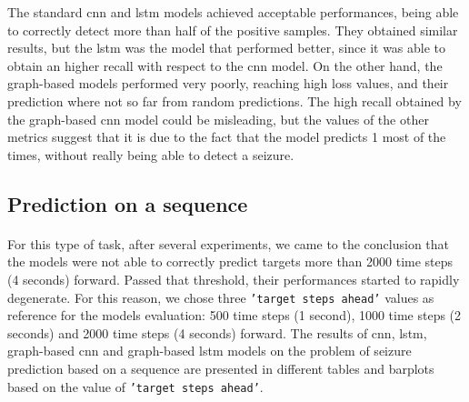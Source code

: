 The standard \acs{cnn} and \acs{lstm} models achieved acceptable performances, being able to correctly detect more than half of the positive samples. They obtained similar results, but the \acs{lstm} was the model that performed better, since it was able to obtain an higher recall with respect to the \acs{cnn} model. On the other hand, the graph-based models performed very poorly, reaching high loss values, and their prediction where not so far from random predictions. The high recall obtained by the graph-based \acs{cnn} model could be misleading, but the values of the other metrics suggest that it is due to the fact that the model predicts 1 most of the times, without really being able to detect a seizure.


\subsection{Prediction on a sequence}
\paragraph{} For this type of task, after several experiments, we came to the conclusion that the models were not able to correctly predict targets more than 2000 time steps (4 seconds) forward. Passed that threshold, their performances started to rapidly degenerate. For this reason, we chose three \texttt{'target steps ahead'} values as reference for the models evaluation: 500 time steps (1 second), 1000 time steps (2 seconds) and 2000 time steps (4 seconds) forward. The results of \acs{cnn}, \acs{lstm}, graph-based \acs{cnn} and graph-based \acs{lstm} models on the problem of seizure prediction based on a sequence are presented in different tables and barplots based on the value of \texttt{'target steps ahead'}.

